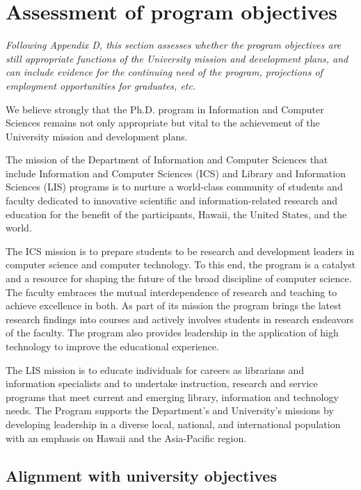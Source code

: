 \documentclass[12pt]{article}
\begin{document}
\section{Assessment of program objectives}

{\em Following Appendix D, this section assesses whether the program
  objectives are still appropriate functions of the University mission and
  development plans, and can include evidence for the continuing need of
  the program, projections of employment opportunities for graduates, etc.}

We believe strongly that the Ph.D. program in Information and Computer
Sciences remains not only appropriate but vital to the achievement of the
University mission and development plans.

The mission of the Department of Information and Computer Sciences that
include Information and Computer Sciences (ICS) and Library and Information
Sciences (LIS) programs is to nurture a world-class community of students
and faculty dedicated to innovative scientific and information-related
research and education for the benefit of the participants, Hawaii, the
United States, and the world. 

The ICS mission is to prepare students to be research and development
leaders in computer science and computer technology. To this end, the
program is a catalyst and a resource for shaping the future of the broad
discipline of computer science. The faculty embraces the mutual
interdependence of research and teaching to achieve excellence in both. As
part of its mission the program brings the latest research findings into
courses and actively involves students in research endeavors of the
faculty. The program also provides leadership in the application of high
technology to improve the educational experience.

The LIS mission is to educate individuals for careers as librarians and
information specialists and to undertake instruction, research and service
programs that meet current and emerging library, information and technology
needs.  The Program supports the Department's and University's missions by
developing leadership in a diverse local, national, and international
population with an emphasis on Hawaii and the Asia-Pacific region.

\subsection{Alignment with university objectives}
\end{document}
